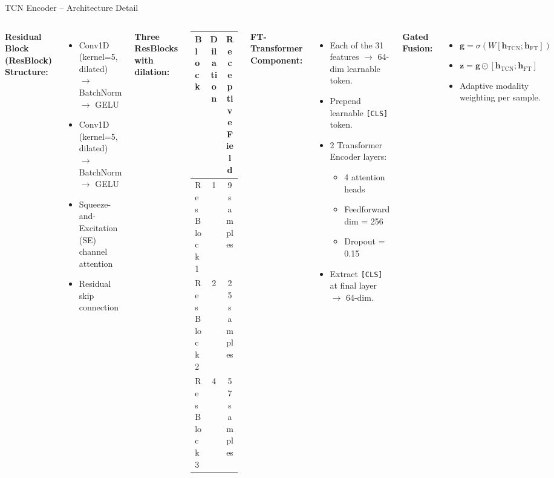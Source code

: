 \documentclass[aspectratio=169]{beamer}
\begin{document}
\begin{frame}{TCN Encoder -- Architecture Detail}
  \begin{columns}[T]
      \textbf{Residual Block (ResBlock) Structure:}
      \begin{itemize}\small
        \item Conv1D (kernel=5, dilated) $\to$ BatchNorm $\to$ GELU
        \item Conv1D (kernel=5, dilated) $\to$ BatchNorm $\to$ GELU
        \item Squeeze-and-Excitation (SE) channel attention
        \item Residual skip connection
      \end{itemize}
      \vspace{0.3em}
      \textbf{Three ResBlocks with dilation:}
      \begin{center}\small
      \begin{tabular}{@{}lcc@{}}
        \toprule
        \textbf{Block} & \textbf{Dilation} & \textbf{Receptive Field} \\
        \midrule
        ResBlock 1 & 1 & 9 samples \\
        ResBlock 2 & 2 & 25 samples \\
        ResBlock 3 & 4 & 57 samples \\
        \bottomrule
      \end{tabular}
      \end{center}
      \textbf{FT-Transformer Component:}
      \begin{itemize}\small
        \item Each of the 31 features $\to$ 64-dim learnable token.
        \item Prepend learnable \texttt{[CLS]} token.
        \item 2 Transformer Encoder layers:
          \begin{itemize}\scriptsize
            \item 4 attention heads
            \item Feedforward dim = 256
            \item Dropout = 0.15
          \end{itemize}
        \item Extract \texttt{[CLS]} at final layer $\to$ 64-dim.
      \end{itemize}
      \vspace{0.3em}
      \textbf{Gated Fusion:}
      \begin{itemize}\small
        \item $\mathbf{g} = \sigma(W[\mathbf{h}_\text{TCN};\mathbf{h}_\text{FT}])$
        \item $\mathbf{z} = \mathbf{g} \odot [\mathbf{h}_\text{TCN};\mathbf{h}_\text{FT}]$
        \item Adaptive modality weighting per sample.
      \end{itemize}
  \end{columns}
\end{frame}
\end{document}
